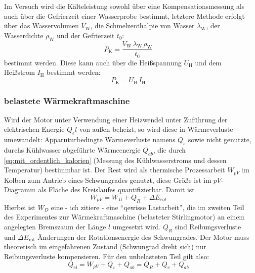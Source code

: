 Im Versuch wird die Kälteleistung sowohl über eine Kompensationsmessung als auch über die Gefrierzeit einer Wasserprobe bestimmt, letztere Methode erfolgt über das Wasservolumen \(V_\text{W}\), die Schmelzenthalpie     von Wasser \(\lambda_\text{W}\), der Wasserdichte \(\rho_\text{W}\) und der Gefrierzeit \(t_0\):
\begin{equation}
    \label{kalteleistung_muhaha}
    P_\text{K} = \frac{V_\text{W} \, \lambda_\text{W} \, \rho_\text{W}}{t_0}
\end{equation}
bestimmt werden. Diese kann auch über die Heißspannung \(U_\text{H}\) und dem Heißstrom \(I_\text{H}\) bestimmt werden:
\begin{equation}
    \label{kalteleistung_muhaha_anders}
    P_\text{K} = U_\text{H} \, I_\text{H}
\end{equation}
\vspace{2cm}

\subsubsection{belastete Wärmekraftmaschine}
Wird der Motor unter Verwendung einer Heizwendel unter Zuführung der elektrischen Energie \(Q_el\) von außen beheizt, so wird diese in Wärmeverluste umewandelt: Apparuturbedingte Wärmeverluste namens \(Q_v\) sowie nicht genutzte, durchs Kühlwasser abgeführte Wärmeenergie \(Q_{ab}\), die durch \cref{eq:mit_ordentlich_kalorien} (Messung des Kühlwasserstroms und dessen Temperatur)  bestimmbar ist. Der Rest wird als thermische Prozessarbeit \(W_{pV}\) im Kolben zum Antrieb eines Schwungrades genutzt, diese Größe ist im \(pV\)-Diagramm als Fläche des Kreislaufes quantifizierbar. Damit ist 
\begin{equation}
    \label{eq:WpV}
    W_{pV}=W_D+Q_R+\Delta E_{rot}
\end{equation}
Hierbei ist \(W_D\) eine - ich zitiere - eine \enquote{qewisse Lastarbeit}, die im zweiten Teil des Experimentes zur Wärmekraftmaschine (belasteter Stirlingmotor) an einem angelegten Bremszaum der Länge \(l\) umgesetzt wird. \(Q_R\) sind Reibungsverluste und \(\Delta E_\text{rot}\) Änderungen der Rotationsenergie des Schwungrades. Der Motor muss theoretisch im eingefahrenen Zustand (Schwungrad dreht sich) nur Reibungsverluste kompensieren. 
Für den unbelasteten Teil gilt also: 
\begin{equation}
    Q_{el}=W_{pV}+Q_v+Q_{ab}=Q_R+Q_v+Q_{ab}
\end{equation}

